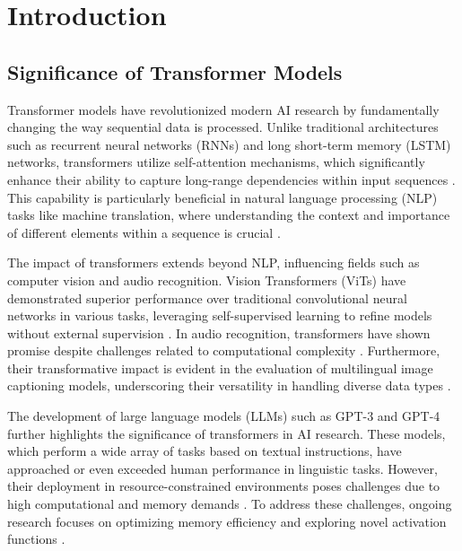 \section{Introduction} \label{sec:Introduction}


\subsection{Significance of Transformer Models} \label{subsec:Significance of Transformer Models}

Transformer models have revolutionized modern AI research by fundamentally changing the way sequential data is processed. Unlike traditional architectures such as recurrent neural networks (RNNs) and long short-term memory (LSTM) networks, transformers utilize self-attention mechanisms, which significantly enhance their ability to capture long-range dependencies within input sequences \cite{wang2023environmenttransformerpolicyoptimization}. This capability is particularly beneficial in natural language processing (NLP) tasks like machine translation, where understanding the context and importance of different elements within a sequence is crucial \cite{bogoychev2020domaintranslationesenoisesynthetic}. 



The impact of transformers extends beyond NLP, influencing fields such as computer vision and audio recognition. Vision Transformers (ViTs) have demonstrated superior performance over traditional convolutional neural networks in various tasks, leveraging self-supervised learning to refine models without external supervision \cite{le2019evolvingselfsupervisedneuralnetworks}. In audio recognition, transformers have shown promise despite challenges related to computational complexity \cite{ma2021repworksspeakerverification}. Furthermore, their transformative impact is evident in the evaluation of multilingual image captioning models, underscoring their versatility in handling diverse data types \cite{thapliyal2022crossmodal3600massivelymultilingualmultimodal}.



The development of large language models (LLMs) such as GPT-3 and GPT-4 further highlights the significance of transformers in AI research. These models, which perform a wide array of tasks based on textual instructions, have approached or even exceeded human performance in linguistic tasks. However, their deployment in resource-constrained environments poses challenges due to high computational and memory demands \cite{kaur2024cropcontextwiserobuststatic}. To address these challenges, ongoing research focuses on optimizing memory efficiency and exploring novel activation functions \cite{chitale2023taskarithmeticloracontinual}.



